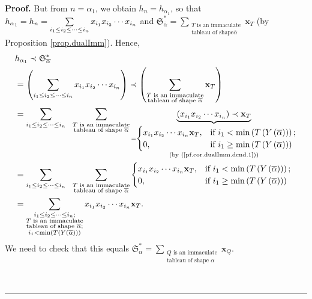 \documentclass[numbers=enddot,12pt,final,onecolumn,notitlepage,abstracton]{scrartcl}%
\theoremstyle{definition}
\newenvironment{proof}[1][Proof]{\noindent\textbf{#1.} }{\ \rule{0.5em}{0.5em}}
\newenvironment{verlong}{}{}
\let\sumnonlimits\sum
\renewcommand{\sum}{\sumnonlimits\limits}
\begin{document}
\begin{proof}
\begin{verlong}
But from $n=\alpha_{1}$, we obtain $h_{n}=h_{\alpha_{1}}$, so that
$h_{\alpha_{1}}=h_{n}=\sum\limits_{i_{1}\leq i_{2}\leq\cdots\leq i_{n}%
}x_{i_{1}}x_{i_{2}}\cdots x_{i_{n}}$ and $\mathfrak{S}_{\overline{\alpha}%
}^{\ast}=\sum_{\substack{T\text{ is an immaculate}\\\text{tableau of shape
}\overline{\alpha}}}\mathbf{x}_{T}$ (by Proposition \ref{prop.dualImm}).
Hence,%
\begin{align}
&  h_{\alpha_{1}}\left.  \prec\right.  \mathfrak{S}_{\overline{\alpha}}^{\ast
}\nonumber\\
&  =\left(  \sum\limits_{i_{1}\leq i_{2}\leq\cdots\leq i_{n}}x_{i_{1}}%
x_{i_{2}}\cdots x_{i_{n}}\right)  \left.  \prec\right.  \left(  \sum
_{\substack{T\text{ is an immaculate}\\\text{tableau of shape }\overline
{\alpha}}}\mathbf{x}_{T}\right) \nonumber\\
&  =\sum\limits_{i_{1}\leq i_{2}\leq\cdots\leq i_{n}}\ \ \sum
_{\substack{T\text{ is an immaculate}\\\text{tableau of shape }\overline
{\alpha}}}\underbrace{\left(  x_{i_{1}}x_{i_{2}}\cdots x_{i_{n}}\right)
\left.  \prec\right.  \mathbf{x}_{T}}_{\substack{=%
\begin{cases}
x_{i_{1}}x_{i_{2}}\cdots x_{i_{n}}\mathbf{x}_{T}, & \text{if }i_{1}%
<\min\left(  T\left(  Y\left(  \overline{\alpha}\right)  \right)  \right)  ;\\
0, & \text{if }i_{1}\geq\min\left(  T\left(  Y\left(  \overline{\alpha
}\right)  \right)  \right)
\end{cases}
\\\text{(by (\ref{pf.cor.dualImm.dend.1}))}}}\nonumber\\
&  =\sum\limits_{i_{1}\leq i_{2}\leq\cdots\leq i_{n}}\ \ \sum
_{\substack{T\text{ is an immaculate}\\\text{tableau of shape }\overline
{\alpha}}}%
\begin{cases}
x_{i_{1}}x_{i_{2}}\cdots x_{i_{n}}\mathbf{x}_{T}, & \text{if }i_{1}%
<\min\left(  T\left(  Y\left(  \overline{\alpha}\right)  \right)  \right)  ;\\
0, & \text{if }i_{1}\geq\min\left(  T\left(  Y\left(  \overline{\alpha
}\right)  \right)  \right)
\end{cases}
\nonumber\\
&  =\sum\limits_{\substack{i_{1}\leq i_{2}\leq\cdots\leq i_{n};\\T\text{ is an
immaculate}\\\text{tableau of shape }\overline{\alpha};\\i_{1}<\min\left(
T\left(  Y\left(  \overline{\alpha}\right)  \right)  \right)  }}x_{i_{1}%
}x_{i_{2}}\cdots x_{i_{n}}\mathbf{x}_{T}. \label{pf.cor.dualImm.dend.RHS}%
\end{align}
We need to check that this equals $\mathfrak{S}_{\alpha}^{\ast}=\sum
_{\substack{Q\text{ is an immaculate}\\\text{tableau of shape }\alpha
}}\mathbf{x}_{Q}$.
\end{verlong}


\end{proof}
\end{document}
